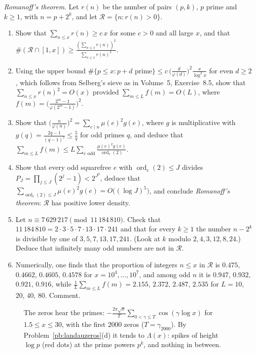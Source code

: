 \begin{exercise}[Journey]\label{pb:romanoff}
\emph{Romanoff's theorem.} Let $r(n)$ be the number of pairs $(p,k)$, $p$ prime and $k\ge1$, with $n=p+2^k$, and let $\mathcal R=\{n:r(n)>0\}$.
\begin{enumerate}[label=(\alph*)]
\item Show that $\sum_{n\le x}r(n)\ge c\,x$ for some $c>0$ and all large $x$, and that $\#(\mathcal R\cap[1,x])\ge\frac{(\sum_{n\le x}r(n))^2}{\sum_{n\le x}r(n)^2}$.
\item Using the upper bound $\#\{p\le x:p+d\text{ prime}\}\le c\,\bigl(\frac d{\varphi(d)}\bigr)^2\frac x{\log^2x}$ for even $d\ge2$, which follows from Selberg's sieve as in
Volume~5, Exercise~8.5, show that $\sum_{n\le x}r(n)^2=O(x)$ provided $\sum_{m\le L}f(m)=O(L)$, where $f(m)=\bigl(\frac{2^m-1}{\varphi(2^m-1)}\bigr)^2$.
\item Show that $\bigl(\frac n{\varphi(n)}\bigr)^2=\sum_{e\mid n}\mu(e)^2g(e)$, where $g$ is multiplicative with $g(q)=\frac{2q-1}{(q-1)^2}\le\frac5q$ for odd primes $q$, and
deduce that $\sum_{m\le L}f(m)\le L\sum_{e\text{ odd}}\frac{\mu(e)^2g(e)}{\operatorname{ord}_e(2)}$.
\item Show that every odd squarefree $e$ with $\operatorname{ord}_e(2)\le J$ divides $P_J=\prod_{j\le J}(2^j-1)<2^{J^2}$, deduce that
$\sum_{\operatorname{ord}_e(2)\le J}\mu(e)^2g(e)=O\bigl((\log J)^5\bigr)$, and conclude \emph{Romanoff's theorem}: $\mathcal R$ has positive lower density.
\item Let $n\equiv7\,629\,217\pmod{11\,184\,810}$. Check that $11\,184\,810=2\cdot3\cdot5\cdot7\cdot13\cdot17\cdot241$ and that for every $k\ge1$ the number $n-2^k$ is
divisible by one of $3,5,7,13,17,241$. (Look at $k$ modulo $2,4,3,12,8,24$.) Deduce that infinitely many odd numbers are not in $\mathcal R$.
\item Numerically, one finds that the proportion of integers $n\le x$ in $\mathcal R$ is $0.475$, $0.4662$, $0.4605$, $0.4578$ for $x=10^4,\dots,10^7$, and among odd $n$
it is $0.947$, $0.932$, $0.921$, $0.916$, while $\frac1L\sum_{m\le L}f(m)=2.155$, $2.372$, $2.487$, $2.535$ for $L=10$, $20$, $40$, $80$. Comment.
\end{enumerate}
\end{exercise}

\begin{figure}[ht]
\centering
{}
\caption{The zeros hear the primes: $-\frac{2\pi\sqrt x}T\sum_{0<\gamma\le T}\cos(\gamma\log x)$ for $1.5\le x\le30$, with the first $2000$ zeros
($T=\gamma_{2000}$). By Problem~\ref{pb:landauzeros}(d) it tends to $\Lambda(x)$: spikes of height $\log p$ (red dots) at the prime powers $p^k$, and nothing in
between.}\label{fig:landau}
\end{figure}

